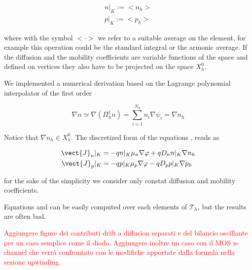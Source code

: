  \begin{align*}
 n|_K := <n_h> \\ 
p|_K := <p_h>
 \end{align*}

where with the symbol $<\cdot >$ we refer to a suitable average on the element, for example this operation could be the standard integral or the armonic average. If the diffusion and the mobility coefficients are variable functions of the space and defined on vertices they also have to be projected on the space $X_h^0$.

We implemented a numerical derivation based on the Lagrange polynomial interpolator of the first order

\begin{equation}
\nabla n \simeq \nabla (\Pi^1_h n) = \sum_{i=1}^{N_h} n_i \nabla \psi_i = \nabla n_h
\end{equation}
 
Notice that $\nabla n_h \in X_h^0$.
The discretized form of the equations ,  reads as

\begin{align}
\vect{J}_n|_K &= -qn|_K\mu_n\nabla \varphi + qD_n n|_K\nabla n_h \label{eq: Jn DD discrete}\\ 
\vect{J}_p|_K &= -qp|_K\mu_p\nabla \varphi - qD_p p|_K \nabla p_h \label{eq: Jp DD discrete} 
\end{align}
 
 for the sake of the simplicity we consider only constat diffusion and mobility coefficients.

Equations  and  can be easily computed over each elements of $\mathcal{T}_h$, but the results are often bad. 
 
 \textcolor{red}{Aggiungere figure dei contributi drift a diffusion separati e del bilancio oscillante per un caso semplice come il diodo. Aggiungere inoltre un caso con il MOS n-channel che verr\`a confrontato con le modifiche apportate dalla formula nella sezione upwinding.}
%
%
%
%
 

